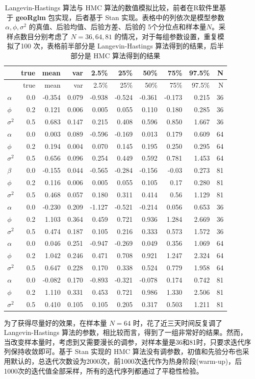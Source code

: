 \documentclass[12pt,a4paper,UTF8,twoside]{book}
\theoremstyle{definition}
\theoremstyle{definition}
\theoremstyle{definition}
\theoremstyle{remark}
\begin{document}
\begin{longtable}[]{@{}lrrrrrrrrr@{}}
\caption{\label{tab:MCLH-vs-NUTS} Langevin-Hastings 算法与 HMC
算法的数值模拟比较，前者在R软件里基于 \textbf{geoRglm} 包实现，后者基于
Stan 实现。表格中的列依次是模型参数 \(\alpha,\phi,\sigma^2\)
的真值、后验均值、后验方差、后验的
5个分位点和样本量\(N\)。采样点数目分别考虑了 \(N = 36, 64, 81\)
的情况，对于每组参数设置，重复模拟了100 次，表格前半部分是
Langevin-Hastings 算法得到的结果，后半部分是 HMC
算法得到的结果}\tabularnewline
\toprule
& true & mean & var & 2.5\% & 25\% & 50\% & 75\% & 97.5\% &
N\tabularnewline
\midrule
\endfirsthead
\toprule
& true & mean & var & 2.5\% & 25\% & 50\% & 75\% & 97.5\% &
N\tabularnewline
\midrule
\endhead
\(\alpha\) & 0.0 & -0.354 & 0.079 & -0.938 & -0.524 & -0.361 & -0.173 &
0.215 & 36\tabularnewline
\(\phi\) & 0.2 & 0.121 & 0.006 & 0.005 & 0.055 & 0.110 & 0.180 & 0.285 &
36\tabularnewline
\(\sigma^2\) & 0.5 & 0.683 & 0.147 & 0.215 & 0.408 & 0.596 & 0.850 &
1.667 & 36\tabularnewline
\(\alpha\) & 0.0 & 0.003 & 0.089 & -0.596 & -0.169 & 0.013 & 0.179 &
0.609 & 64\tabularnewline
\(\phi\) & 0.2 & 0.194 & 0.004 & 0.070 & 0.145 & 0.195 & 0.250 & 0.295 &
64\tabularnewline
\(\sigma^2\) & 0.5 & 0.656 & 0.096 & 0.254 & 0.449 & 0.592 & 0.781 &
1.453 & 64\tabularnewline
\(\beta\) & 0.0 & -0.155 & 0.044 & -0.565 & -0.284 & -0.156 & -0.03 &
0.273 & 81\tabularnewline
\(\phi\) & 0.2 & 0.116 & 0.006 & 0.005 & 0.055 & 0.105 & 0.17 & 0.280 &
81\tabularnewline
\(\sigma^2\) & 0.5 & 0.468 & 0.057 & 0.180 & 0.311 & 0.414 & 0.56 &
1.129 & 81\tabularnewline
\(\alpha\) & 0.0 & -0.230 & 0.209 & -1.127 & -0.521 & -0.214 & 0.056 &
0.653 & 36\tabularnewline
\(\phi\) & 0.2 & 1.103 & 0.364 & 0.459 & 0.721 & 0.936 & 1.284 & 2.669 &
36\tabularnewline
\(\sigma^2\) & 0.5 & 0.474 & 0.187 & 0.105 & 0.216 & 0.333 & 0.573 &
1.572 & 36\tabularnewline
\(\alpha\) & 0.0 & 0.046 & 0.251 & -0.947 & -0.269 & 0.049 & 0.356 &
1.069 & 64\tabularnewline
\(\phi\) & 0.2 & 1.042 & 0.246 & 0.471 & 0.708 & 0.921 & 1.247 & 2.324 &
64\tabularnewline
\(\sigma^2\) & 0.5 & 0.647 & 0.228 & 0.170 & 0.338 & 0.524 & 0.779 &
1.958 & 64\tabularnewline
\(\alpha\) & 0.0 & -0.082 & 0.170 & -0.893 & -0.321 & -0.078 & 0.174 &
0.742 & 81\tabularnewline
\(\phi\) & 0.2 & 1.110 & 0.331 & 0.453 & 0.721 & 0.986 & 1.330 & 2.506 &
81\tabularnewline
\(\sigma^2\) & 0.5 & 0.410 & 0.105 & 0.105 & 0.205 & 0.317 & 0.503 &
1.211 & 81\tabularnewline
\bottomrule
\end{longtable}

为了获得尽量好的效果，在样本量 \(N = 64\) 时，花了近三天时间反复调了
Langevin-Hastings
算法的参数，相比较而言，得到了一组非常好的结果。然而，当改变样本量时，考虑到又需要漫长的调参，对样本量是36和81时，只要求迭代序列保持收敛即可。基于
Stan 实现的 HMC
算法没有调参数，初值和先验分布也采用默认的，总迭代次数设为2000次，前1000次迭代作为热身阶段(warm-up)，后1000次的迭代值全部采样，所有的迭代序列都通过了平稳性检验。
\end{document}
